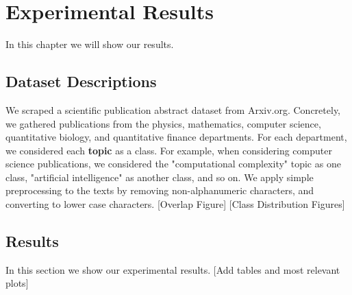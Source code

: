 
\chapter{Experimental Results} \label{Results}
In this chapter we will show our results.

\section{Dataset Descriptions}

We scraped a scientific publication abstract dataset from Arxiv.org. Concretely, we gathered
publications from the physics, mathematics, computer science, quantitative biology,
and quantitative finance departments. For each department, we considered each \textbf{topic} as a
class. For example, when considering computer science publications, we considered the
"computational complexity" topic as one class, "artificial intelligence" as another class,
and so on. We apply simple preprocessing to the texts by removing non-alphanumeric
characters, and converting to lower case characters. [Overlap Figure] [Class Distribution
Figures]

\section{Results}
In this section we show our experimental results. [Add tables and most relevant plots]
